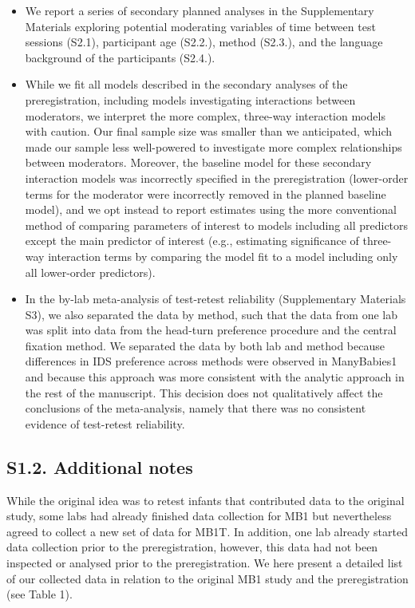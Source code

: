 \documentclass[
  man, donotrepeattitle,floatsintext]{apa6}
\begin{document}
\begin{itemize}
\item
  We report a series of secondary planned analyses in the Supplementary Materials exploring potential moderating variables of time between test sessions (S2.1), participant age (S2.2.), method (S2.3.), and the language background of the participants (S2.4.).
\item
  While we fit all models described in the secondary analyses of the preregistration, including models investigating interactions between moderators, we interpret the more complex, three-way interaction models with caution. Our final sample size was smaller than we anticipated, which made our sample less well-powered to investigate more complex relationships between moderators. Moreover, the baseline model for these secondary interaction models was incorrectly specified in the preregistration (lower-order terms for the moderator were incorrectly removed in the planned baseline model), and we opt instead to report estimates using the more conventional method of comparing parameters of interest to models including all predictors except the main predictor of interest (e.g., estimating significance of three-way interaction terms by comparing the model fit to a model including only all lower-order predictors).
\item
  In the by-lab meta-analysis of test-retest reliability (Supplementary Materials S3), we also separated the data by method, such that the data from one lab was split into data from the head-turn preference procedure and the central fixation method. We separated the data by both lab and method because differences in IDS preference across methods were observed in ManyBabies1 and because this approach was more consistent with the analytic approach in the rest of the manuscript. This decision does not qualitatively affect the conclusions of the meta-analysis, namely that there was no consistent evidence of test-retest reliability.
\end{itemize}

\hypertarget{s1.2.-additional-notes}{%
\subsection{S1.2. Additional notes}\label{s1.2.-additional-notes}}

While the original idea was to retest infants that contributed data to the original study, some labs had already finished data collection for MB1 but nevertheless agreed to collect a new set of data for MB1T. In addition, one lab already started data collection prior to the preregistration, however, this data had not been inspected or analysed prior to the preregistration. We here present a detailed list of our collected data in relation to the original MB1 study and the preregistration (see Table 1).
\end{document}
